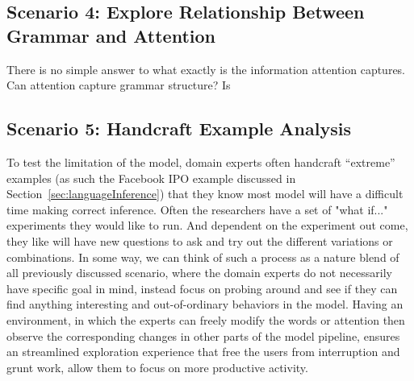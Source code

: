 \subsection{Scenario 4: Explore Relationship Between Grammar and Attention}
There is no simple answer to what exactly is the information attention captures.
Can attention capture grammar structure? Is 

\subsection{Scenario 5: Handcraft Example Analysis}
To test the limitation of the model, domain experts often handcraft ``extreme'' examples (as such the Facebook IPO example discussed in Section~\ref{sec:languageInference}) that they know most model will have a difficult time making correct inference. 
%
Often the researchers have a set of "what if..." experiments they would like to run. And dependent on the experiment out come, they like will have new questions to ask and try out the different variations or combinations.
%
In some way, we can think of such a process as a nature blend of all previously discussed scenario, where the domain experts do not necessarily have specific goal in mind, instead focus on probing around and see if they can find anything interesting and out-of-ordinary behaviors in the model.
%
Having an environment, in which the experts can freely modify the words or attention then observe the corresponding changes in other parts of the model pipeline, ensures an streamlined exploration experience that free the users from interruption and grunt work, allow them to focus on more productive activity. 

